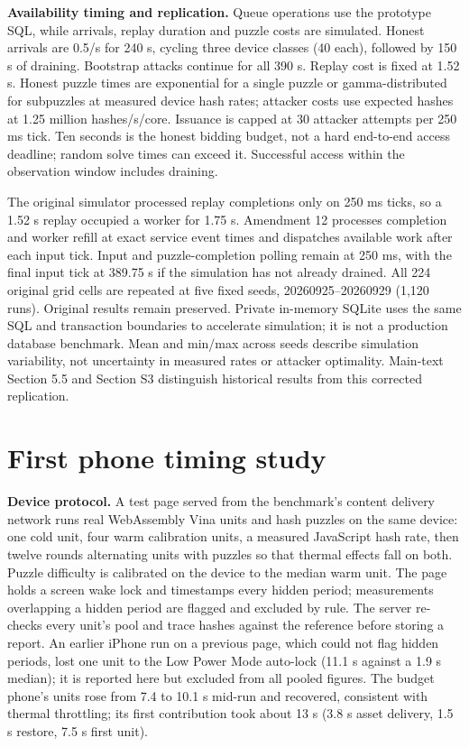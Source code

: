 \documentclass[11pt]{article}
\begin{document}
\textbf{Availability timing and replication.} Queue operations use the prototype SQL, while arrivals, replay duration and puzzle costs are simulated. Honest arrivals are 0.5/s for 240 s, cycling three device classes (40 each), followed by 150 s of draining. Bootstrap attacks continue for all 390 s. Replay cost is fixed at 1.52 s. Honest puzzle times are exponential for a single puzzle or gamma-distributed for subpuzzles at measured device hash rates; attacker costs use expected hashes at 1.25 million hashes/s/core. Issuance is capped at 30 attacker attempts per 250 ms tick. Ten seconds is the honest bidding budget, not a hard end-to-end access deadline; random solve times can exceed it. Successful access within the observation window includes draining.

The original simulator processed replay completions only on 250 ms ticks, so a 1.52 s replay occupied a worker for 1.75 s. Amendment 12 processes completion and worker refill at exact service event times and dispatches available work after each input tick. Input and puzzle-completion polling remain at 250 ms, with the final input tick at 389.75 s if the simulation has not already drained. All 224 original grid cells are repeated at five fixed seeds, 20260925--20260929 (1,120 runs). Original results remain preserved. Private in-memory SQLite uses the same SQL and transaction boundaries to accelerate simulation; it is not a production database benchmark. Mean and min/max across seeds describe simulation variability, not uncertainty in measured rates or attacker optimality. Main-text Section 5.5 and Section S3 distinguish historical results from this corrected replication.

\section{First phone timing study}

\textbf{Device protocol.} A test page served from the benchmark's content delivery network runs real WebAssembly Vina units and hash puzzles on the same device: one cold unit, four warm calibration units, a measured JavaScript hash rate, then twelve rounds alternating units with puzzles so that thermal effects fall on both. Puzzle difficulty is calibrated on the device to the median warm unit. The page holds a screen wake lock and timestamps every hidden period; measurements overlapping a hidden period are flagged and excluded by rule. The server re-checks every unit's pool and trace hashes against the reference before storing a report. An earlier iPhone run on a previous page, which could not flag hidden periods, lost one unit to the Low Power Mode auto-lock (11.1 s against a 1.9 s median); it is reported here but excluded from all pooled figures. The budget phone's units rose from 7.4 to 10.1 s mid-run and recovered, consistent with thermal throttling; its first contribution took about 13 s (3.8 s asset delivery, 1.5 s restore, 7.5 s first unit).
\end{document}
